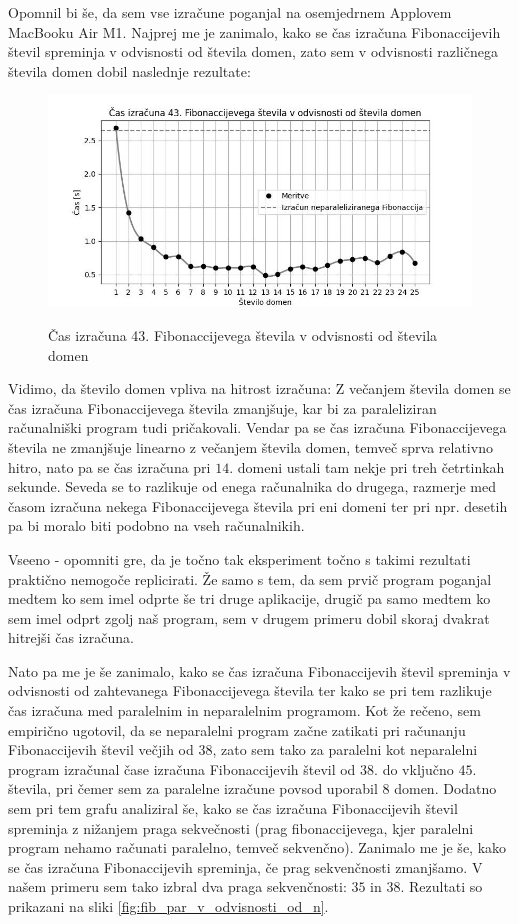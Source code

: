 \documentclass[mat1, tisk]{fmfdelo}
\begin{document}
Opomnil bi še, da sem vse izračune poganjal na osemjedrnem Applovem MacBooku Air M1.
Najprej me je zanimalo, kako se čas izračuna Fibonaccijevih števil spreminja v odvisnosti od števila domen, zato sem
v odvisnosti različnega števila domen dobil naslednje rezultate:

\begin{figure}[h!]
  \centering
  \caption{Čas izračuna 43. Fibonaccijevega števila v odvisnosti od števila domen}
  \includegraphics[width=13cm]{slike/fib_par_v_odvisnosti_od_domen.jpg}
  \label{fig:fib_par_v_odvisnosti_od_domen}
\end{figure}

Vidimo, da število domen vpliva na hitrost izračuna: Z večanjem števila domen se čas izračuna Fibonaccijevega števila
zmanjšuje, kar bi za paraleliziran računalniški program tudi pričakovali. Vendar pa se čas izračuna Fibonaccijevega
števila ne zmanjšuje linearno z večanjem števila domen, temveč sprva relativno hitro, nato pa se čas izračuna pri $14.$
domeni ustali tam nekje pri treh četrtinkah sekunde. Seveda se to razlikuje od enega računalnika do drugega, razmerje
med časom izračuna nekega Fibonaccijevega števila pri eni domeni ter pri npr. desetih pa bi moralo biti podobno na vseh
računalnikih.

Vseeno - opomniti gre, da je točno tak eksperiment točno s takimi rezultati praktično nemogoče replicirati.
Že samo s tem, da sem prvič program poganjal medtem ko sem imel odprte še tri druge aplikacije, 
drugič pa samo medtem ko sem imel odprt zgolj naš program, sem v drugem primeru dobil skoraj dvakrat hitrejši čas izračuna.

Nato pa me je še zanimalo, kako se čas izračuna Fibonaccijevih števil spreminja v odvisnosti od zahtevanega
Fibonaccijevega števila ter kako se pri tem razlikuje čas izračuna med paralelnim in neparalelnim programom.
Kot že rečeno, sem empirično ugotovil, da se neparalelni program začne zatikati pri računanju Fibonaccijevih števil
večjih od $38$, zato sem tako za paralelni kot neparalelni program izračunal čase izračuna Fibonaccijevih števil od $38.$
do vključno $45.$ števila, pri čemer sem za paralelne izračune povsod uporabil $8$ domen. Dodatno sem pri tem grafu
analiziral še, kako se čas izračuna Fibonaccijevih števil spreminja z nižanjem praga sekvečnosti (prag fibonaccijevega,
kjer paralelni program nehamo računati paralelno, temveč sekvenčno). Zanimalo me je še, kako se čas izračuna
Fibonaccijevih spreminja, če prag sekvenčnosti zmanjšamo. V našem primeru sem tako izbral dva praga sekvenčnosti:
$35$ in $38$. Rezultati so prikazani na sliki \ref{fig:fib_par_v_odvisnosti_od_n}.
\end{document}
